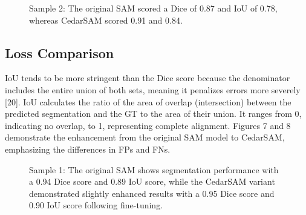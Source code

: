 \documentclass[letterpaper, 10 pt, conference]{ieeeconf}  %
\begin{document}
\begin{figure}[thpb]
  \centering
  \caption{Sample 2: The original SAM scored a Dice of 0.87 and IoU of 0.78, whereas CedarSAM scored 0.91 and 0.84.}
  \label{fig:score_distributions}
\end{figure}

\subsection{Loss Comparison}
IoU tends to be more stringent than the Dice score because the denominator includes the entire union of both sets, meaning it penalizes errors more severely [20]. IoU calculates the ratio of the area of overlap (intersection) between the predicted segmentation and the GT to the area of their union. It ranges from 0, indicating no overlap, to 1, representing complete alignment. Figures 7 and 8 demonstrate the enhancement from the original SAM model to CedarSAM, emphasizing the differences in FPs and FNs.

\begin{figure}[thpb]
  \centering
  \caption{Sample 1: The original SAM shows segmentation performance with a 0.94 Dice score and 0.89 IoU score, while the CedarSAM variant demonstrated slightly enhanced results with a 0.95 Dice score and 0.90 IoU score following fine-tuning.}
  \label{fig:score_distributions}
\end{figure}
\end{document}
